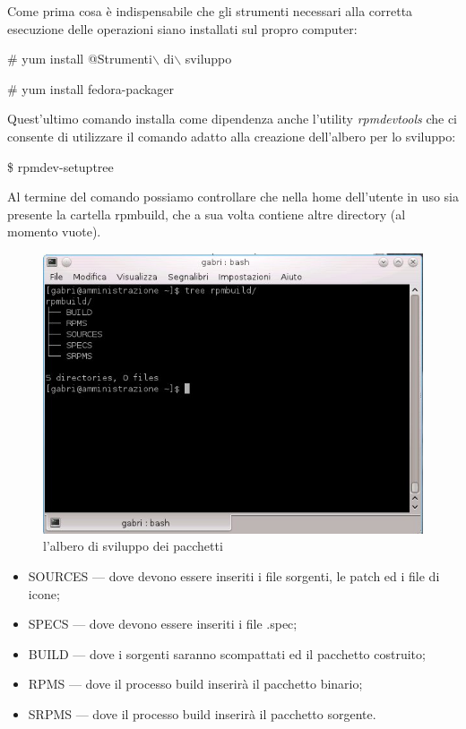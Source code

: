 Come prima cosa è indispensabile che gli strumenti necessari alla corretta esecuzione delle operazioni siano installati sul propro computer:

\begin{shaded}
{\color[cmyk]{0, 0, 0, 0}\# yum install @Strumenti$\backslash$ di$\backslash$ sviluppo}
\end{shaded}

\begin{shaded}
{\color[cmyk]{0, 0, 0, 0}\# yum install fedora-packager}
\end{shaded}

Quest'ultimo comando installa come dipendenza anche l'utility {\itshape rpmdevtools} che ci consente di utilizzare il comando adatto alla creazione dell'albero per lo sviluppo:

\begin{shaded}
{\color[cmyk]{0, 0, 0, 0}\$ rpmdev-setuptree}
\end{shaded}

Al termine del comando possiamo controllare che nella home dell'utente in uso sia presente la cartella rpmbuild, che a sua volta contiene altre directory (al momento vuote).

\begin{figure}[!ht]
\centering
\includegraphics[scale=.95]{articoli/sistema_avanzato/immagini/rpmbuild_tree.jpeg}
\caption{l'albero di sviluppo dei pacchetti }
\end{figure}

\begin{itemize}
\item SOURCES — dove devono essere inseriti i file sorgenti, le patch ed i file di icone;
\item SPECS — dove devono essere inseriti i file .spec;
\item BUILD — dove i sorgenti saranno scompattati ed il pacchetto costruito;
\item RPMS — dove il processo build inserirà il pacchetto binario;
\item SRPMS — dove il processo build inserirà il pacchetto sorgente.
\end{itemize}


